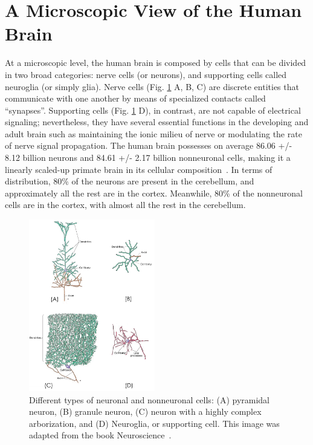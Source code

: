 \section{A Microscopic View of the Human Brain}
At a microscopic level, the human brain is composed by cells that can be
divided in two broad categories: nerve cells (or neurons), and supporting cells
called neuroglia (or simply glia). Nerve cells (Fig. \ref{fig:neuron_types} A, B, C)
are discrete entities that communicate with one another by means of specialized
contacts called “synapses”\cite{Purves2004}. Supporting cells (Fig. \ref{fig:neuron_types} D),
in contrast, are not capable of electrical signaling; nevertheless,
they have several essential functions in the developing and adult brain such
as maintaining the ionic milieu of nerve or modulating the rate of nerve signal
propagation. The human brain possesses on average 86.06 +/- 8.12 billion neurons
and 84.61 +/- 2.17 billion nonneuronal cells, making it a linearly scaled-up
primate brain in its cellular composition~\cite{Azevedo2009}. In terms of
distribution, 80\% of the neurons are present in the cerebellum, and approximately
all the rest are in the cortex. Meanwhile, 80\% of the nonneuronal cells are in
the cortex, with almost all the rest in the cerebellum.
% 
\begin{figure}[h]
    \includegraphics[width=0.49\textwidth]{2.neuroanatomy/img/neurons.png}
    \caption{Different types of neuronal and nonneuronal cells: (A) pyramidal
             neuron, (B) granule neuron, (C) neuron with a highly complex
             arborization, and (D) Neuroglia, or supporting cell. This image was adapted from the book Neuroscience~\cite{Purves2004}.}
    \label{fig:neuron_types}
\end{figure}


